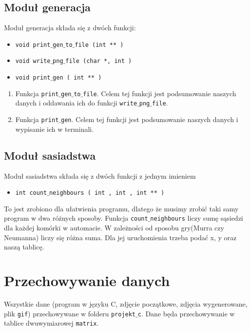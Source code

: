 \documentclass[a4paper, 12pt]{article}
\begin{document}
		\subsection{Moduł generacja}
			\hspace*{1cm} Moduł generacja składa się z dwóch funkcji: 
		\begin{itemize}
			\item \texttt{void print$\_$gen$\_$to$\_$file (int ** )} 
			\item \texttt{void write$\_$png$\_$file (char *, int )} 
			\item \texttt{void print$\_$gen ( int ** )} 
		\end{itemize}
		
		\begin{enumerate}
			\item Funkcja \texttt{print$\_$gen$\_$to$\_$file}. Celem tej funkcji jest podsumowanie naszych danych i oddawania ich do funkcji \texttt{write$\_$png$\_$file}.	
			\item Funkcja \texttt{print$\_$gen}. Celem tej funkcji jest podsumowanie naszych danych i wypisanie ich w terminali.
		\end{enumerate}
			
			
			
		\subsection{Moduł sasiadstwa}
			\hspace*{1cm} Moduł sasiadstwa składa się z dwóch funkcji z jednym imieniem 
		\begin{itemize}
			\item \texttt{int count$\_$neighbours ( int , int , int ** )} 
		\end{itemize}
			\hspace*{1cm} To jest zrobiono dla ułatwienia programu, dlatego że musimy zrobić taki samy program w dwa różnych sposoby. Funkcja \texttt{count$\_$neighbours} liczy sumę sąsiedzi dla każdej komórki w automacie. W zależności od sposobu gry(Murra czy Neumanna) liczy się różna suma. Dla jej uruchomienia trzeba podać x, y oraz naszą tablicę.
\newpage
	\section{Przechowywanie danych}
			\hspace*{1cm} Wszystkie dane (program w języku C, zdjęcie początkowe, zdjęcia wygenerowane, plik \texttt{gif}) przechowywane w folderu \texttt{projekt$\_$c}.\newline
			\hspace*{1cm} Dane będa przechowywanie w tablice dwuwymiarowej \texttt{matrix}.
\end{document}
